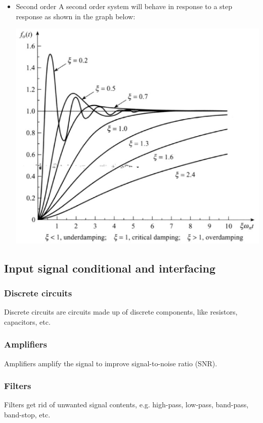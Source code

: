 \documentclass[11pt]{article}
\begin{document}
 \newpage

\begin{itemize}
\item Second order
A second order system will behave in response to a step response as shown in the graph below:
\begin{center}
\includegraphics[width=.9\linewidth]{./images/second-order-system-response.png}
\end{center}
\end{itemize}

 \newpage
\subsection{Input signal conditional and interfacing}
\label{sec:org408559d}

\subsubsection{Discrete circuits}
\label{sec:org8e6549d}
Discrete circuits are circuits made up of discrete components, like resistors, capacitors, etc.
\subsubsection{Amplifiers}
\label{sec:orgcaa4e76}
Amplifiers amplify the signal to improve signal-to-noise ratio (SNR).
\subsubsection{Filters}
\label{sec:org0c576d1}
Filters get rid of unwanted signal contents, e.g. high-pass, low-pass, band-pass, band-stop, etc.
\end{document}

